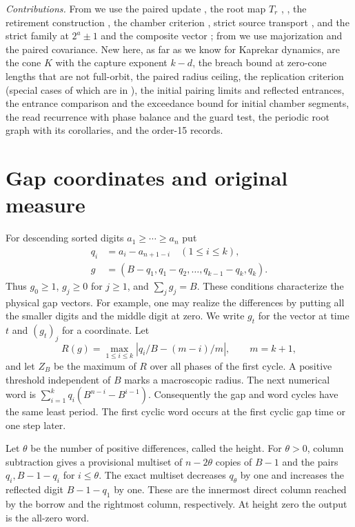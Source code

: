 \documentclass[11pt]{amsart}
\theoremstyle{definition}
\begin{document}
\emph{Contributions.} From \cite{G9,G10} we use the paired update
\cite[Lemma~4]{G10}, the root map \(T_r\) \cite[Section~2.2]{G9},
\cite[Section~5]{G10}, the retirement construction
\cite[Section~4]{G9}, the chamber criterion \cite[Theorem~1]{G10},
strict source transport \cite[Proposition~7]{G10}, and the strict family
at \(2^a\pm1\) and the composite vector \cite[Section~3]{G10}; from
\cite{G4} we use majorization and the paired covariance. New here, as
far as we know for Kaprekar dynamics, are the cone \(K\) with the
capture exponent \(k-d\), the breach bound at zero-cone lengths that are
not full-orbit, the paired radius ceiling, the replication criterion
(special cases of which are in \cite{KDO,KDE}), the initial pairing
limits and reflected entrances, the entrance comparison and the
exceedance bound for initial chamber segments, the read recurrence with phase balance and the guard test, the
periodic root graph with its corollaries, and the order-15 records.

\section{Gap coordinates and original measure}\label{sec:setup}

For descending sorted digits \(a_1\ge\cdots\ge a_n\) put
\[
 \begin{aligned}
 q_i&=a_i-a_{n+1-i}\quad(1\le i\le k),\\
 g&=(B-q_1,q_1-q_2,\ldots,q_{k-1}-q_k,q_k).
 \end{aligned}
\]
Thus \(g_0\ge1\), \(g_j\ge0\) for \(j\ge1\), and \(\sum_jg_j=B\).
These conditions characterize the physical gap vectors. For example,
one may realize the differences by putting all the smaller digits and
the middle digit at zero. We write \(g_t\) for the vector at time \(t\)
and \((g_t)_j\) for a coordinate. Let
\[
 R(g)=\max_{1\le i\le k}|q_i/B-(m-i)/m|,\qquad m=k+1,
\]
and let \(Z_B\) be the maximum of \(R\) over all phases of the first cycle.
A positive threshold independent of \(B\) marks a macroscopic radius.
The next numerical word is \(\sum_{i=1}^k q_i(B^{n-i}-B^{i-1})\).
Consequently the gap and word cycles have the same least period. The
first cyclic word occurs at the first cyclic gap time or one step later.

Let \(\theta\) be the number of positive differences, called the height.
For \(\theta>0\), column subtraction gives a provisional multiset of
\(n-2\theta\) copies of \(B-1\) and the pairs \(q_i,B-1-q_i\) for
\(i\le\theta\).
The exact multiset decreases \(q_\theta\) by one and increases the reflected
digit \(B-1-q_1\) by one. These are the innermost direct column reached
by the borrow and the rightmost column, respectively. At height zero
the output is the all-zero word.
\end{document}

